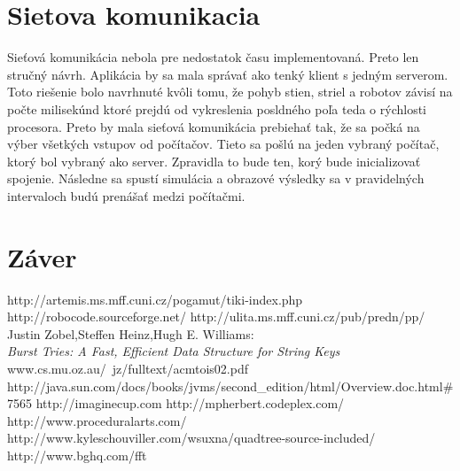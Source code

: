 \documentclass[12pt,a4paper,notitlepage]{report}
\begin{document}
\chapter{Sietova komunikacia}
Sieťová komunikácia nebola pre nedostatok času implementovaná. Preto len stručný návrh. Aplikácia by sa mala správať ako tenký klient s jedným serverom. Toto riešenie bolo navrhnuté kvôli tomu, že pohyb stien, striel a robotov závisí na počte milisekúnd ktoré prejdú od vykreslenia posldného poľa teda o rýchlosti procesora. Preto by mala sieťová komunikácia prebiehať tak, že sa počká na výber všetkých vstupov od počítačov. Tieto sa pošlú na jeden vybraný počítač, ktorý bol vybraný ako server. Zpravidla to bude ten, korý bude inicializovať spojenie. Následne sa spustí simulácia a obrazové výsledky sa v pravidelných intervaloch budú prenášať medzi počítačmi.

\chapter{Záver}
\newpage
{}
\begin{thebibliography}{99}
http://artemis.ms.mff.cuni.cz/pogamut/tiki-index.php
 http://robocode.sourceforge.net/
 http://ulita.ms.mff.cuni.cz/pub/predn/pp/
Justin Zobel,Steffen Heinz,Hugh E. Williams:\\
{\it Burst Tries: A Fast, Efficient Data Structure for String Keys} www.cs.mu.oz.au/~jz/fulltext/acmtois02.pdf
http://java.sun.com/docs/books/jvms/second\_edition/html/Overview.doc.html\#7565
http://imaginecup.com
http://mpherbert.codeplex.com/
http://www.proceduralarts.com/
http://www.kyleschouviller.com/wsuxna/quadtree-source-included/
http://www.bghq.com/fft 
\end{thebibliography}
\end{document}
